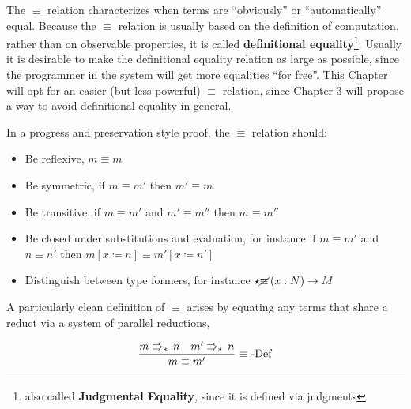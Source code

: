 The $\equiv$ relation characterizes when terms are ``obviously'' or ``automatically'' equal.
Because the $\equiv$ relation is usually based on the definition of computation, rather than on observable properties, it is called \textbf{definitional equality}\footnote{
  also called \textbf{Judgmental Equality}, since it is defined via judgments
}.
Usually it is desirable to make the definitional equality relation as large as possible, since the programmer in the system will get more equalities ``for free''.
This Chapter will opt for an easier (but less powerful) $\equiv$ relation, since Chapter 3 will propose a way to avoid definitional equality in general.
 
In a progress and preservation style proof, the $\equiv$ relation should:
 
\begin{itemize}
\item Be reflexive, $m\equiv m$
\item Be symmetric, if $m\equiv m'$ then $m'\equiv m$
\item Be transitive, if $m\equiv m'$ and $m'\equiv m''$ then $m\equiv m''$
\item Be closed under substitutions and evaluation, for instance if $m\equiv m'$ and $n\equiv n'$ then $m\left[x\coloneqq n\right]\equiv m'\left[x\coloneqq n'\right]$
\item Distinguish between type formers, for instance $\star\cancel{\equiv}\left(x:N\right)\rightarrow M$
\end{itemize}
A particularly clean definition of $\equiv$ arises by equating any terms that share a reduct via a system of parallel reductions,
 
\[
\frac{m\Rrightarrow_{\ast}\,n\quad m'\Rrightarrow_{\ast}\,n}{m\equiv m'}\,\operatorname{\equiv-Def}
\]
 

